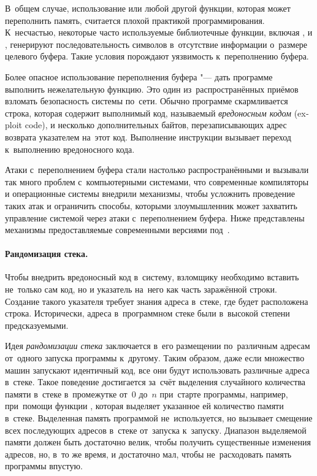 В~общем случае, использование  или любой другой функции, которая может переполнить память, считается плохой практикой программирования. К~несчастью, некоторые часто используемые библиотечные функции, включая ,  и , генерируют последовательность символов в~отсутствие информации о~размере целевого буфера. Такие условия порождают уязвимость к~переполнению буфера.

Более опасное использование переполнения буфера "--- дать программе выполнить нежелательную функцию. Это один из~распространённых приёмов взломать безопасность системы по~сети. Обычно программе скармливается строка, которая содержит выполнимый код, называемый \emph{вредоносным кодом} (\textenglish{exploit code}), и несколько дополнительных байтов, перезаписывающих адрес возврата указателем на~этот код. Выполнение инструкции  вызывает переход к~выполнению вредоносного кода.



Атаки с~переполнением буфера стали настолько распространёнными и вызывали так много проблем с~компьютерными системами, что современные компиляторы и операционные системы внедрили механизмы, чтобы усложнить проведение таких атак и ограничить способы, которыми злоумышленник может захватить управление системой через атаки с~переполнением буфера. Ниже представлены механизмы предоставляемые современными версиями \GCC{} под~.



\paragraph{Рандомизация стека.}
Чтобы внедрить вредоносный код в~систему, взломщику необходимо вставить не~только сам код, но и указатель на~него как часть заражённой строки. Создание такого указателя требует знания адреса в~стеке, где будет расположена строка. Исторически, адреса в~программном стеке были в~высокой степени предсказуемыми.

Идея \emph{рандомизации стека} заключается в~его размещении по~различным адресам от~одного запуска программы к~другому. Таким образом, даже если множество машин запускают идентичный код, все они будут использовать различные адреса в~стеке. Такое поведение достигается за~счёт выделения случайного количества памяти в~стеке в~промежутке от~\(0\) до~\(n\) при~старте программы, например, при~помощи функции , которая выделяет указанное ей количество памяти в~стеке. Выделенная память программой не~используется, но вызывает смещение всех последующих адресов в~стеке от~запуска к~запуску. Диапазон выделяемой памяти должен быть достаточно велик, чтобы получить существенные изменения адресов, но, в~то же время, и достаточно мал, чтобы не~расходовать память программы впустую.

